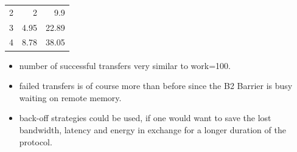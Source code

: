 \documentclass[a4paper, 10pt]{article}
\begin{document}
\begin{itemize}
\begin{itemize}
\begin{table}[htbp]
\begin{tabular}{r | r r}
						\hline
						2       & 2                     & 9.9             \\
						3       & 4.95                  & 22.89           \\
						4       & 8.78                  & 38.05           \\
					\end{tabular}
					\label{tab:d2-transfers-1000}
				\end{table}
				\begin{itemize}
					\item number of successful transfers very similar to work=100.
					\item failed transfers is of course more than before since the B2 Barrier is busy waiting on remote memory.
					\item back-off strategies could be used, if one would want to save the lost bandwidth, latency and energy in exchange for a longer duration of the protocol.
				\end{itemize}
		\end{itemize}
\end{itemize}

\end{document}
